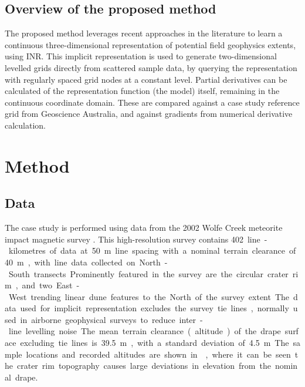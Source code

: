 \subsection{Overview of the proposed method}
\label{sec:overview}
The proposed method leverages recent approaches in the literature to learn a continuous three-dimensional representation of potential field geophysics extents, using INR\@.
This implicit representation is used to generate two-dimensional levelled grids directly from scattered sample data, by querying the representation with regularly spaced grid nodes at a constant level.
Partial derivatives can be calculated of the representation function (the model) itself, remaining in the continuous coordinate domain.
These are compared against a case study reference grid from Geoscience Australia, and against gradients from numerical derivative calculation.


\section{Method}
\subsection{Data}
The case study is performed using data from the 2002 Wolfe Creek meteorite impact magnetic survey \parencite{wolfecreek2019}.
This high-resolution survey contains \qty{402} line-kilometres of data at \qty{50}{\m} line spacing with a nominal terrain clearance of \qty{40}{\m}, with line data collected on North-South transects.
Prominently featured in the survey are the circular crater rim, and two East-West trending linear dune features to the North of the survey extent.
The data used for implicit representation excludes the survey tie lines, normally used in airborne geophysical surveys to reduce inter-line levelling noise.
The mean terrain clearance (altitude) of the drape surface excluding tie lines is \qty{39.5}{\m}, with a standard deviation of \qty{4.5}{\m}.
The sample locations and recorded altitudes are shown in , where it can be seen the crater rim topography causes large deviations in elevation from the nominal drape.

